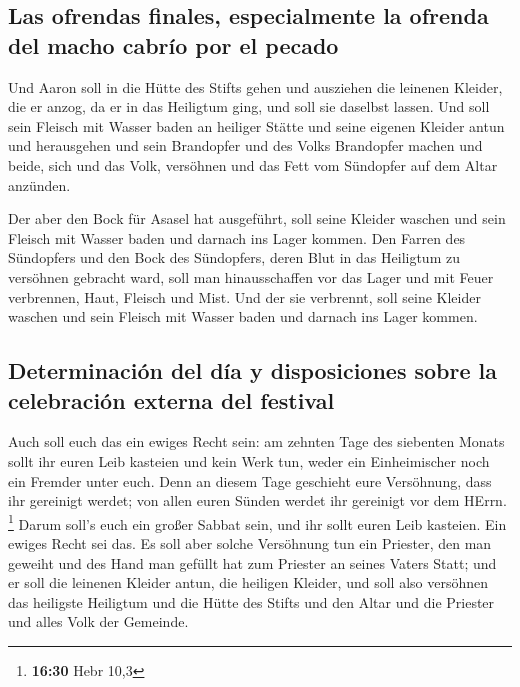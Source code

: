 \hypertarget{las-ofrendas-finales-especialmente-la-ofrenda-del-macho-cabruxedo-por-el-pecado}{%
\subsection{Las ofrendas finales, especialmente la ofrenda del macho
cabrío por el
pecado}\label{las-ofrendas-finales-especialmente-la-ofrenda-del-macho-cabruxedo-por-el-pecado}}

 Und Aaron soll in die Hütte des Stifts gehen und
ausziehen die leinenen Kleider, die er anzog, da er in das Heiligtum
ging, und soll sie daselbst lassen.  Und soll sein
Fleisch mit Wasser baden an heiliger Stätte und seine eigenen Kleider
antun und herausgehen und sein Brandopfer und des Volks Brandopfer
machen und beide, sich und das Volk, versöhnen  und das
Fett vom Sündopfer auf dem Altar anzünden.

 Der aber den Bock für Asasel hat ausgeführt, soll seine
Kleider waschen und sein Fleisch mit Wasser baden und darnach ins Lager
kommen.  Den Farren des Sündopfers und den Bock des
Sündopfers, deren Blut in das Heiligtum zu versöhnen gebracht ward, soll
man hinausschaffen vor das Lager und mit Feuer verbrennen, Haut, Fleisch
und Mist.  Und der sie verbrennt, soll seine Kleider
waschen und sein Fleisch mit Wasser baden und darnach ins Lager kommen.

\hypertarget{determinaciuxf3n-del-duxeda-y-disposiciones-sobre-la-celebraciuxf3n-externa-del-festival}{%
\subsection{Determinación del día y disposiciones sobre la celebración
externa del
festival}\label{determinaciuxf3n-del-duxeda-y-disposiciones-sobre-la-celebraciuxf3n-externa-del-festival}}

 Auch soll euch das ein ewiges Recht sein: am zehnten
Tage des siebenten Monats sollt ihr euren Leib kasteien und kein Werk
tun, weder ein Einheimischer noch ein Fremder unter euch.
 Denn an diesem Tage geschieht eure Versöhnung, dass ihr
gereinigt werdet; von allen euren Sünden werdet ihr gereinigt vor dem
HErrn. \footnote{\textbf{16:30} Hebr 10,3}  Darum soll's
euch ein großer Sabbat sein, und ihr sollt euren Leib kasteien. Ein
ewiges Recht sei das.  Es soll aber solche Versöhnung tun
ein Priester, den man geweiht und des Hand man gefüllt hat zum Priester
an seines Vaters Statt; und er soll die leinenen Kleider antun, die
heiligen Kleider,  und soll also versöhnen das heiligste
Heiligtum und die Hütte des Stifts und den Altar und die Priester und
alles Volk der Gemeinde.


